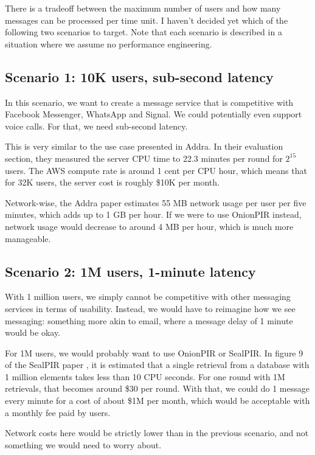 \documentclass[sigconf, nonacm, balance=false, natbib=false, screen]{acmart}
\begin{document}
There is a tradeoff between the maximum number of users and how many messages can be processed per time unit. I haven't decided yet which of the following two scenarios to target. Note that each scenario is described in a situation where we assume no performance engineering.

\subsection{Scenario 1: 10K users, sub-second latency}

In this scenario, we want to create a message service that is competitive with Facebook Messenger, WhatsApp and Signal. We could potentially even support voice calls. For that, we need sub-second latency.

This is very similar to the use case presented in Addra. In their evaluation section, they measured the server CPU time to 22.3 minutes per round for $2^{15}$ users. The AWS compute rate is around 1 cent per CPU hour, which means that for 32K users, the server cost is roughly \$10K per month.

Network-wise, the Addra paper estimates 55 MB network usage per user per five minutes, which adds up to 1 GB per hour. If we were to use OnionPIR instead, network usage would decrease to around 4 MB per hour, which is much more manageable.

\subsection{Scenario 2: 1M users, 1-minute latency}

With 1 million users, we simply cannot be competitive with other messaging services in terms of usability. Instead, we would have to reimagine how we see messaging: something more akin to email, where a message delay of 1 minute would be okay.

For 1M users, we would probably want to use OnionPIR or SealPIR. In figure 9 of the SealPIR paper \cite{angel2018pir}, it is estimated that a single retrieval from a database with 1 million elements takes less than 10 CPU seconds. For one round with 1M retrievals, that becomes around \$30 per round. With that, we could do 1 message every minute for a cost of about \$1M per month, which would be acceptable with a monthly fee paid by users.

Network costs here would be strictly lower than in the previous scenario, and not something we would need to worry about.
\end{document}
